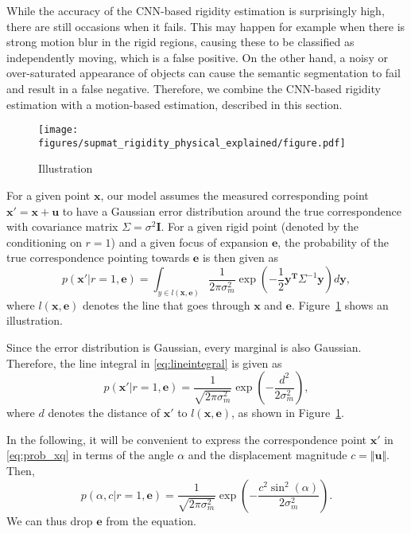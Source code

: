 \documentclass[10pt,twocolumn,letterpaper]{article}
\begin{document}
While the accuracy of the CNN-based rigidity estimation is surprisingly high, there are still occasions when it fails.
This may happen for example when there is strong motion blur in the rigid regions, causing these to be classified as independently moving, which is a false positive. 
On the other hand, a noisy or over-saturated appearance of objects can cause the semantic segmentation to fail and result in a false negative.
Therefore, we combine the CNN-based rigidity estimation with a motion-based estimation, described in this section.

\begin{figure}
	\centering
	\texttt{[image: figures/supmat\_rigidity\_physical\_explained/figure.pdf]}
	\caption{Illustration}
	\label{fig:illustration}
\end{figure}

For a given point $\mathbf{x}$, our model assumes the measured corresponding point $\mathbf{x}' = \mathbf{x} + \mathbf{u}$ to have a Gaussian error distribution around the true correspondence with covariance matrix $\Sigma = \sigma^2 \mathbf{I}$.
For a given rigid point (denoted by the conditioning on $r=1$) and a given focus of expansion $\mathbf{e}$, the probability of the true correspondence pointing towards $\mathbf{e}$ is then given as
\begin{equation}
p \left( \mathbf{x'} \vert r=1, \mathbf{e} \right)
=
\int_{y \in l(\mathbf{x},\mathbf{e} ) }
\frac{1}{2 \pi \sigma_m^2} \exp \left( - \frac{1}{2} \mathbf{y^T} \Sigma^{-1} \mathbf{y} \right) d\mathbf{y},
\label{eq:lineintegral}
\end{equation}
where $l(\mathbf{x},\mathbf{e} )$ denotes the line that goes through $\mathbf{x}$ and $\mathbf{e}$.
Figure~\ref{fig:illustration} shows an illustration.

Since the error distribution is Gaussian, every marginal is also Gaussian.
Therefore, the line integral in \eqref{eq:lineintegral} is given as
\begin{equation}
p \left( \mathbf{x'} \vert r=1, \mathbf{e} \right)
=
\frac{1}{\sqrt{2 \pi \sigma_m^2}}
\exp \left( - \frac{d^2}{2 \sigma_m^2} \right),
\label{eq:prob_xq}
\end{equation}
where $d$ denotes the distance of $\mathbf{x'}$ to $l(\mathbf{x},\mathbf{e} )$, as shown in Figure~\ref{fig:illustration}.

In the following, it will be convenient to express the correspondence point $\mathbf{x'}$ in \eqref{eq:prob_xq} in terms of the angle $\alpha$ and the displacement magnitude $c = \Vert \mathbf{u} \Vert$.
Then,
\begin{equation}
p \left( \alpha, c \vert r=1, \mathbf{e} \right)
=
\frac{1}{\sqrt{2 \pi \sigma_m^2}}
\exp \left( - \frac{c^2 \sin^2(\alpha)}{2 \sigma_m^2} \right) .
\label{eq:prob_calpha}
\end{equation}
We can thus drop $\mathbf{e}$ from the equation.
\end{document}
